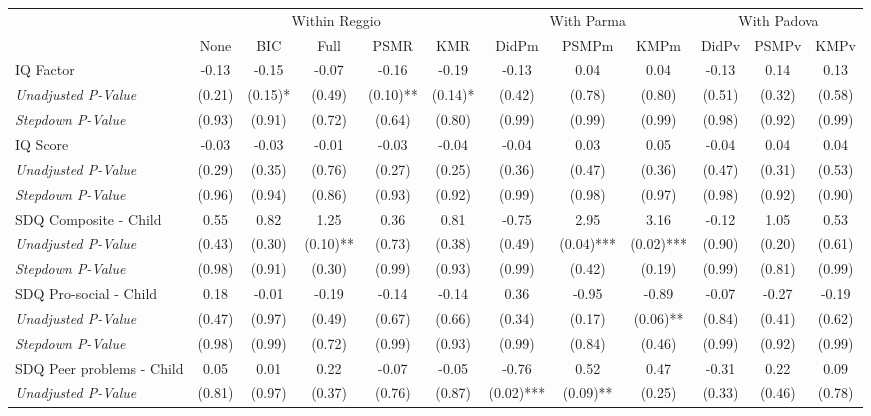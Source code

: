 \begin{tabular}{l c c c c c c c c c c c}
\toprule
& \multicolumn{5}{c}{Within Reggio} & \multicolumn{3}{c}{With Parma} & \multicolumn{3}{c}{With Padova} \\\cmidrule(lr){2-6} \cmidrule(lr){7-9} \cmidrule(lr){10-12}
 & None & BIC & Full & PSMR & KMR & DidPm & PSMPm & KMPm & DidPv & PSMPv & KMPv \\
\midrule
IQ Factor & -0.13 & -0.15 & -0.07 & -0.16 & -0.19 & -0.13 & 0.04 & 0.04 & -0.13 & 0.14 & 0.13 \\
\quad \textit{Unadjusted P-Value} & (0.21) & (0.15)* & (0.49) & (0.10)** & (0.14)* & (0.42) & (0.78) & (0.80) & (0.51) & (0.32) & (0.58) \\
\quad \textit{Stepdown P-Value} & (0.93) & (0.91) & (0.72) & (0.64) & (0.80) & (0.99) & (0.99) & (0.99) & (0.98) & (0.92) & (0.99) \\
IQ Score & -0.03 & -0.03 & -0.01 & -0.03 & -0.04 & -0.04 & 0.03 & 0.05 & -0.04 & 0.04 & 0.04 \\
\quad \textit{Unadjusted P-Value} & (0.29) & (0.35) & (0.76) & (0.27) & (0.25) & (0.36) & (0.47) & (0.36) & (0.47) & (0.31) & (0.53) \\
\quad \textit{Stepdown P-Value} & (0.96) & (0.94) & (0.86) & (0.93) & (0.92) & (0.99) & (0.98) & (0.97) & (0.98) & (0.92) & (0.90) \\
SDQ Composite - Child & 0.55 & 0.82 & 1.25 & 0.36 & 0.81 & -0.75 & 2.95 & 3.16 & -0.12 & 1.05 & 0.53 \\
\quad \textit{Unadjusted P-Value} & (0.43) & (0.30) & (0.10)** & (0.73) & (0.38) & (0.49) & (0.04)*** & (0.02)*** & (0.90) & (0.20) & (0.61) \\
\quad \textit{Stepdown P-Value} & (0.98) & (0.91) & (0.30) & (0.99) & (0.93) & (0.99) & (0.42) & (0.19) & (0.99) & (0.81) & (0.99) \\
SDQ Pro-social - Child & 0.18 & -0.01 & -0.19 & -0.14 & -0.14 & 0.36 & -0.95 & -0.89 & -0.07 & -0.27 & -0.19 \\
\quad \textit{Unadjusted P-Value} & (0.47) & (0.97) & (0.49) & (0.67) & (0.66) & (0.34) & (0.17) & (0.06)** & (0.84) & (0.41) & (0.62) \\
\quad \textit{Stepdown P-Value} & (0.98) & (0.99) & (0.72) & (0.99) & (0.93) & (0.99) & (0.84) & (0.46) & (0.99) & (0.92) & (0.99) \\
SDQ Peer problems - Child & 0.05 & 0.01 & 0.22 & -0.07 & -0.05 & -0.76 & 0.52 & 0.47 & -0.31 & 0.22 & 0.09 \\
\quad \textit{Unadjusted P-Value} & (0.81) & (0.97) & (0.37) & (0.76) & (0.87) & (0.02)*** & (0.09)** & (0.25) & (0.33) & (0.46) & (0.78) \\

\end{tabular}
